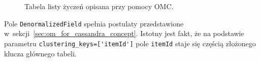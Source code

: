 \begin{figure}[ht!]
	\centering
	\theverbbox
	\caption{Tabela listy życzeń opisana przy pomocy OMC.}
	\label{lst:omc_wishlist_definition}
\end{figure}

Pole \verb+DenormalizedField+ spełnia postulaty przedstawione w~sekcji~\ref{sec:om_for_cassandra_concept}. Istotny jest fakt, że na podstawie parametru \verb+clustering_keys=['itemId']+ pole \verb+itemId+ staje się częścią złożonego klucza głównego tabeli.
